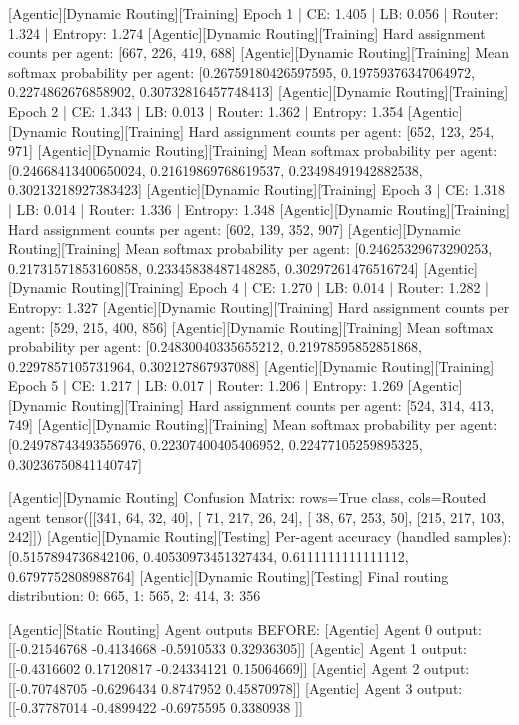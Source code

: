 [Agentic][Dynamic Routing][Training] Epoch 1 | CE: 1.405 | LB: 0.056 | Router: 1.324 | Entropy: 1.274
[Agentic][Dynamic Routing][Training] Hard assignment counts per agent: [667, 226, 419, 688]
[Agentic][Dynamic Routing][Training] Mean softmax probability per agent: [0.26759180426597595, 0.19759376347064972, 0.2274862676858902, 0.30732816457748413]
[Agentic][Dynamic Routing][Training] Epoch 2 | CE: 1.343 | LB: 0.013 | Router: 1.362 | Entropy: 1.354
[Agentic][Dynamic Routing][Training] Hard assignment counts per agent: [652, 123, 254, 971]
[Agentic][Dynamic Routing][Training] Mean softmax probability per agent: [0.24668413400650024, 0.21619869768619537, 0.23498491942882538, 0.30213218927383423]
[Agentic][Dynamic Routing][Training] Epoch 3 | CE: 1.318 | LB: 0.014 | Router: 1.336 | Entropy: 1.348
[Agentic][Dynamic Routing][Training] Hard assignment counts per agent: [602, 139, 352, 907]
[Agentic][Dynamic Routing][Training] Mean softmax probability per agent: [0.24625329673290253, 0.21731571853160858, 0.23345838487148285, 0.30297261476516724]
[Agentic][Dynamic Routing][Training] Epoch 4 | CE: 1.270 | LB: 0.014 | Router: 1.282 | Entropy: 1.327
[Agentic][Dynamic Routing][Training] Hard assignment counts per agent: [529, 215, 400, 856]
[Agentic][Dynamic Routing][Training] Mean softmax probability per agent: [0.24830040335655212, 0.21978595852851868, 0.2297857105731964, 0.302127867937088]
[Agentic][Dynamic Routing][Training] Epoch 5 | CE: 1.217 | LB: 0.017 | Router: 1.206 | Entropy: 1.269
[Agentic][Dynamic Routing][Training] Hard assignment counts per agent: [524, 314, 413, 749]
[Agentic][Dynamic Routing][Training] Mean softmax probability per agent: [0.24978743493556976, 0.22307400405406952, 0.22477105259895325, 0.30236750841140747]

[Agentic][Dynamic Routing] Confusion Matrix: rows=True class, cols=Routed agent
tensor([[341,  64,  32,  40],
[ 71, 217,  26,  24],
[ 38,  67, 253,  50],
[215, 217, 103, 242]])
[Agentic][Dynamic Routing][Testing] Per-agent accuracy (handled samples): [0.5157894736842106, 0.40530973451327434, 0.6111111111111112, 0.6797752808988764]
[Agentic][Dynamic Routing][Testing] Final routing distribution: {0: 665, 1: 565, 2: 414, 3: 356}

[Agentic][Static Routing] Agent outputs BEFORE:
[Agentic] Agent 0 output: [[-0.21546768 -0.4134668  -0.5910533   0.32936305]]
[Agentic] Agent 1 output: [[-0.4316602   0.17120817 -0.24334121  0.15064669]]
[Agentic] Agent 2 output: [[-0.70748705 -0.6296434   0.8747952   0.45870978]]
[Agentic] Agent 3 output: [[-0.37787014 -0.4899422  -0.6975595   0.3380938 ]]

